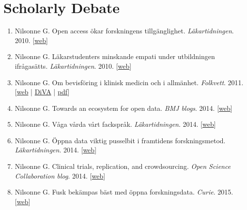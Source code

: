 \documentclass[10pt,a4paper,twocolumn]{article}
\begin{document}
\section{Scholarly Debate}
\begin{enumerate}

    \item Nilsonne G. Open access ökar forskningens tillgänglighet. \textit{Läkartidningen}. 2010. [\href{http://www.lakartidningen.se/OldWebArticlePdf/1/15188/2491.pdf}{web}]

    \item Nilsonne G. Läkarstudenters minskande empati under utbildningen ifrågasätts. \textit{Läkartidningen}. 2010. [\href{http://ww2.lakartidningen.se/07engine.php?articleId=14714}{web}]

    \item Nilsonne G. Om bevisföring i klinisk medicin och i allmänhet. \textit{Folkvett}. 2011. [\href{http://www.vof.se/folkvett/ar-2011/nr-1/om-bevisforing-klinisk-medicin-och-allmanhet/}{web} | \href{http://www.diva-portal.org/smash/record.jsf?pid=diva2%3A1055191\&dswid=-9257}{DiVA} | \href{http://www.diva-portal.org/smash/get/diva2:1055191/FULLTEXT01.pdf}{pdf}]

    \item Nilsonne G. Towards an ecosystem for open data. \textit{BMJ blogs}. 2014. [\href{http://blogs.bmj.com/bmj/2014/10/24/gustav-nilsonne-towards-an-ecosystem-for-open-data/}{web}]

    \item Nilsonne G. Våga vårda vårt fackspråk. \textit{Läkartidningen}. 2014. [\href{http://www.lakartidningen.se/Aktuellt/Kultur/Kultur/2014/02/Vaga-varda-vart-facksprak/}{web}]

    \item Nilsonne G. Öppna data viktig pusselbit i framtidens forskningsmetod. \textit{Läkartidningen}. 2014. [\href{http://www.lakartidningen.se/Opinion/Debatt/2014/10/Oppna-data-viktig-pusselbit-i-framtidens-forskningsmetod/}{web}]

    \item Nilsonne G. Clinical trials, replication, and crowdsourcing. \textit{Open Science Collaboration blog}. 2014. [\href{http://osc.centerforopenscience.org/2014/11/19/clinical-trials-replication-crowdsourcing/}{web}]

    \item Nilsonne G. Fusk bekämpas bäst med öppna forskningsdata. \textit{Curie}. 2015. [\href{http://www.tidningencurie.se/22/kronikor/kronikor/2015-06-30-gustav-nilsonne-fusk-bekampas-bast-med-oppna-forskningsdata.html}{web}]


\end{enumerate}
\end{document}
